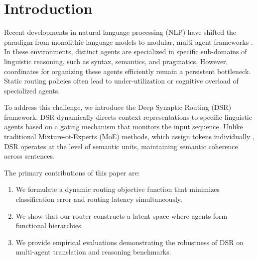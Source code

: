 \section{Introduction}
\label{sec:intro}
Recent developments in natural language processing (NLP) have shifted the paradigm from monolithic language models to modular, multi-agent frameworks \citep{jenkins2024dsr}. In these environments, distinct agents are specialized in specific sub-domains of linguistic reasoning, such as syntax, semantics, and pragmatics. However, coordinates for organizing these agents efficiently remain a persistent bottleneck. Static routing policies often lead to under-utilization or cognitive overload of specialized agents.

To address this challenge, we introduce the Deep Synaptic Routing (DSR) framework. DSR dynamically directs context representations to specific linguistic agents based on a gating mechanism that monitors the input sequence. Unlike traditional Mixture-of-Experts (MoE) methods, which assign tokens individually \citep{vance2023neural}, DSR operates at the level of semantic units, maintaining semantic coherence across sentences.

The primary contributions of this paper are:
\begin{enumerate}
  \item We formulate a dynamic routing objective function that minimizes classification error and routing latency simultaneously.
  \item We show that our router constructs a latent space where agents form functional hierarchies.
  \item We provide empirical evaluations demonstrating the robustness of DSR on multi-agent translation and reasoning benchmarks.
\end{enumerate}
